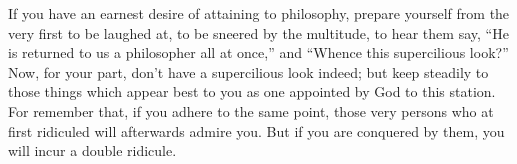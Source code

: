 If you have an earnest desire of attaining to philosophy, prepare yourself from
the very first to  be laughed at, to be sneered by the  multitude, to hear them
say, ``He  is returned  to us a  philosopher all at  once,'' and  ``Whence this
supercilious look?'' Now, for your part, don't have a supercilious look indeed;
but keep steadily to those things which  appear best to you as one appointed by
God to this station. For remember that,  if you adhere to the same point, those
very persons who at first ridiculed will  afterwards admire you. But if you are
conquered by them, you will incur a double ridicule.
